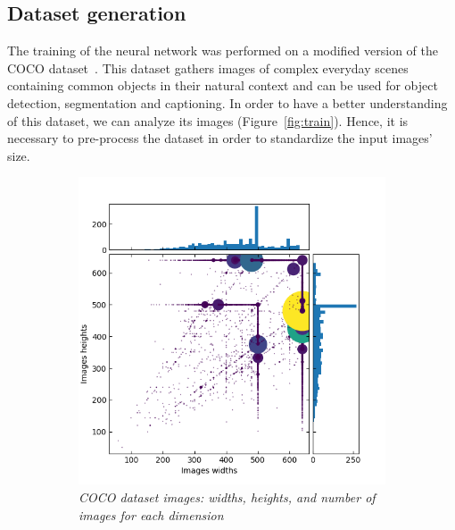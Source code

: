 \documentclass{article}
\begin{document}
    \subsection{Dataset generation}
        \label{par:coco}
        The training of the neural network was performed on a modified version of the COCO dataset~\cite{microsoft2014}. This dataset gathers images of complex everyday scenes containing common objects in their natural context and can be used for object detection, segmentation and captioning. In order to have a better understanding of this dataset, we can analyze its images (Figure~\ref{fig:train}). Hence, it is necessary to pre-process the dataset in order to standardize the input images' size.

        \begin{figure}[!ht]
            \begin{subfigure}{.49\linewidth}
                \centering
                \includegraphics[width=\linewidth]{pics/train2017full.png}
                \caption{\textit{COCO dataset images: widths, heights, and number of images for each dimension}}
            \end{subfigure}
            \begin{subfigure}{.49\linewidth}
                \centering
                \begin{tabular}{|c||c|c|c|}

\end{tabular}
\end{subfigure}
\end{figure}
\end{document}

